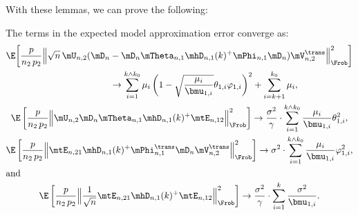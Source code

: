 With these lemmas, we can prove the following:

\begin{lemma}
	The terms in the expected model approximation error converge as:
	\begin{subequations}
	\begin{gather}
		\begin{split}
		\E\bigg[ 
			\frac{p}{n_2 \, p_2} 
			\Big\|
				\sqrt{n} \,
				\mU_{n,2} 
				( 
					\mD_n 
					&- 
					\mD_n 
					\mTheta_{n,1} \mhD_{n,1}(k)^+ \mPhi_{n,1}
					\mD_n
				)
				\mV_{n,2}^\trans 
			\Big\|_\Frob^2
		\bigg] \\
			&\to 
			 	\sum_{i=1}^{k \wedge k_0}
					\mu_i 
					\left( 
						1 
						- 
						\sqrt{ \frac{ \mu_i }{ \bmu_{1,i} } }
						\theta_{1,i}
						\varphi_{1,i}
					\right)^2
				+
				\sum_{i=k+1}^{k_0}
					\mu_i,
		\end{split}\\
		\E\left[ 
			\frac{p}{n_2 \, p_2} 
			\Big\|
				\mU_{n,2} 
				\mD_n \mTheta_{n,1} \mhD_{n,1}(k)^+ 
				\mtE_{n,12}
			\Big\|_\Frob^2
		\right]
			\to
				\frac{\sigma^2}{\gamma}
				\cdot 
				\sum_{i=1}^{k \wedge k_0}
					\frac{\mu_i}{\bmu_{1,i}}
					\theta_{1,i}^2,
				\\
		\E\left[ 
			\frac{p}{n_2 \, p_2} 
			\Big\|
				\mtE_{n,21}
				\mhD_{n,1}(k)^+ \mPhi_{n,1}^\trans \mD_n 
				\mV_{n,2}^\trans
			\Big\|_\Frob^2
		\right]
			\to
				\sigma^2
				\cdot
				\sum_{i=1}^{k \wedge k_0} 
					\frac{\mu_i}{\bmu_{1,i}}
					\varphi_{1,i}^2,
				\\
\intertext{and}
		\E\left[ 
			\frac{p}{n_2 \, p_2} 
			\Big\|
				\frac{1}{\sqrt{n}}
				\mtE_{n,21}
				\mhD_{n,1}(k)^+
				\mtE_{n,12}
			\Big\|_\Frob^2
		\right]
			\to
				\frac{\sigma^2}{\gamma}
				\cdot
				\sum_{i=1}^k
					\frac{\sigma^2}{\bmu_{1,i}}.
	\end{gather}
    \end{subequations}
\end{lemma}
